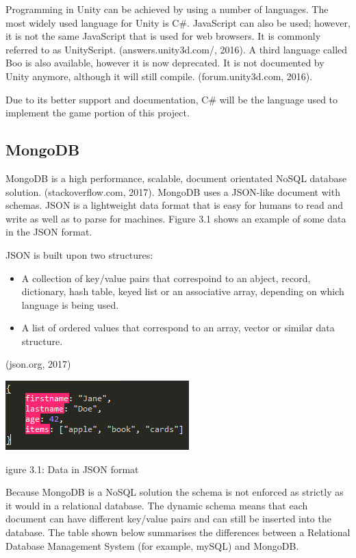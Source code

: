 \documentclass[12pt]{article}
\begin{document}
Programming in Unity can be achieved by using a number of languages. The most widely used language for Unity is C#. JavaScript can also be used; however, it is not the same JavaScript that is used for web browsers. It is commonly referred to as UnityScript. (answers.unity3d.com/, 2016). A third language called Boo is also available, however it is now deprecated. It is not documented by Unity anymore, although it will still compile. (forum.unity3d.com, 2016).

Due to its better support and documentation, C# will be the language used to implement the game portion of this project.

\begin{center}
\subsection{MongoDB}
\end{center}
MongoDB is a high performance, scalable, document orientated NoSQL database solution. (stackoverflow.com, 2017). MongoDB uses a JSON-like document with schemas. JSON is a lightweight data format that is easy for humans to read and write as well as to parse for machines. Figure 3.1 shows an example of some data in the JSON format.

JSON is built upon two structures: 
\begin{itemize}
	\item A collection of key/value pairs that correspoind to an abject, record, dictionary, hash table, keyed list or an associative array, depending on which language is being used.
	\item A list of ordered values that correspond to an array, vector or similar data structure. 
\end{itemize}

(json.org, 2017)

\begin{center}
	\includegraphics[scale=1]{json_no_id.PNG}
	
	\caption Figure 3.1: Data in JSON format
\end{center}

Because MongoDB is a NoSQL solution the schema is not enforced as strictly as it would in a relational database. The dynamic schema means that each document can have different key/value pairs and can still be inserted into the database. The table shown below summarises the differences between a Relational Database Management System (for example, mySQL) and MongoDB.
\end{document}

